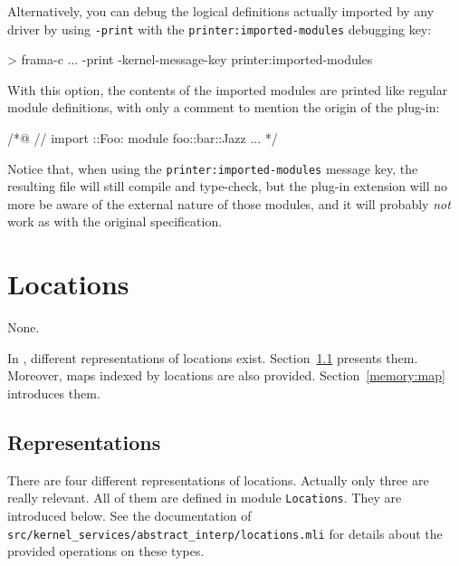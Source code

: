 Alternatively, you can debug the logical definitions actually imported by any
driver by using \verb+-print+ with the \verb+printer:imported-modules+ debugging
key:
\begin{frama-c-commands}
> frama-c ... -print -kernel-message-key printer:imported-modules
\end{frama-c-commands}

With this option, the contents of the imported modules are printed like regular
module definitions, with only a comment to mention the origin of the plug-in:
\begin{ccode}
/*@ // import \myplugin::Foo:
    module foo::bar::Jazz {
        ...
    }
  */
\end{ccode}

Notice that, when using the \verb+printer:imported-modules+ message key, the
resulting file will still compile and type-check, but the plug-in extension will
no more be aware of the external nature of those modules, and it will probably
\emph{not} work as with the original specification.


\section{Locations}\label{adv:memory}

\begin{prereq}
  None.
\end{prereq}

In \framac, different representations of \C locations
exist. Section~\ref{memory:repr} presents them. Moreover, maps indexed by
locations are also provided. Section~\ref{memory:map} introduces them.

\subsection{Representations}\label{memory:repr}

There are four different representations of \C locations. Actually only three
are really relevant. All of them are defined in module
\texttt{Locations}. They are introduced below. See the
documentation of \texttt{src/kernel\_services/abstract\_interp/locations.mli}
for details about the provided operations on these types.

